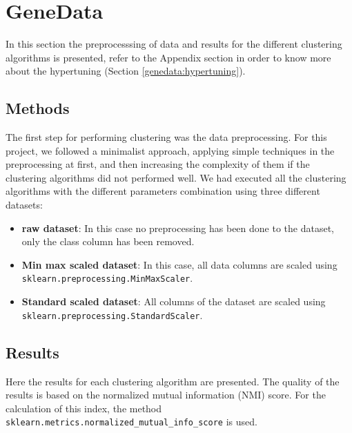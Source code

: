 \documentclass[12pt]{article}
\begin{document}
\setcounter{page}{1}
\tableofcontents

\newpage

\section{GeneData}

In this section the preprocesssing of data and results for the different clustering algorithms is presented, refer to the Appendix section in order to know more about the hypertuning (Section \ref{genedata:hypertuning}).

\subsection{Methods}

The first step for performing clustering was the data preprocessing. For this project, we followed a minimalist approach, applying simple techniques in the preprocessing at first, and then increasing the complexity of them if the clustering algorithms did not performed well. We had executed all the clustering algorithms with the different parameters combination using three different datasets:

\begin{itemize}
    \item \textbf{raw dataset}: In this case no preprocessing has been done to the dataset, only the class column has been removed.
    \item \textbf{Min max scaled dataset}: In this case, all data columns are scaled using \texttt{sklearn.preprocessing.MinMaxScaler}.
    \item \textbf{Standard scaled dataset}: All columns of the dataset are scaled using \texttt{sklearn.preprocessing.StandardScaler}.
\end{itemize}

\subsection{Results}

Here the results for each clustering algorithm are  presented. The quality of the results is based on the normalized mutual information (NMI) score. For the calculation of this index, the method \texttt{sklearn.metrics.normalized\_mutual\_info\_score} is used.
\end{document}
